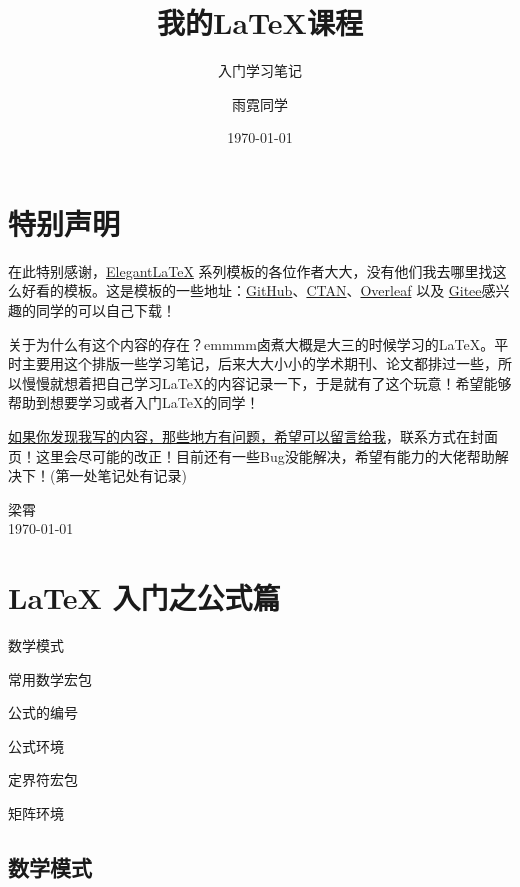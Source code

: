 \documentclass[cn,chinese,color=cyan]{elegantbook}
\title{我的LaTeX课程}
\subtitle{入门学习笔记}
\author{雨霓同学}
\institute{910014191@qq.com}
\date{\today}
\begin{document}
\frontmatter
{}%
\maketitle
\tableofcontents
\mainmatter	
\chapter*{特别声明}
在此特别感谢，\href{https://elegantlatex.org/}{Elegant\LaTeX{}} 系列模板的各位作者大大，没有他们我去哪里找这么好看的模板。这是模板的一些地址：\href{https://github.com/ElegantLaTeX}{GitHub}、\href{https://ctan.org/pkg/elegantbook}{CTAN}、\href{https://www.overleaf.com/latex/templates/elegantbook-template/zpsrbmdsxrgy}{Overleaf} 以及 \href{https://gitee.com/ElegantLaTeX/ElegantBook}{Gitee}感兴趣的同学的可以自己下载！ 

关于为什么有这个内容的存在？emmmm卤煮大概是大三的时候学习的\LaTeX 。平时主要用这个排版一些学习笔记，后来大大小小的学术期刊、论文都排过一些，所以慢慢就想着把自己学习\LaTeX 的内容记录一下，于是就有了这个玩意！希望能够帮助到想要学习或者入门\LaTeX 的同学！



\underline{如果你发现我写的内容，那些地方有问题，希望可以留言给我}，联系方式在封面页！这里会尽可能的改正！目前还有一些Bug没能解决，希望有能力的大佬帮助解决下！(第一处笔记处有记录)

\vskip 1.5cm

\begin{flushright}
	梁霄\\
	\today
\end{flushright}
	
	

\chapter{LaTeX 入门之公式篇}
\begin{introduction}
	\item 数学模式
	\item 常用数学宏包
	\item 公式的编号
	\item 公式环境
	\item 定界符宏包
	\item 矩阵环境
\end{introduction}
\section{数学模式}
\end{document}
